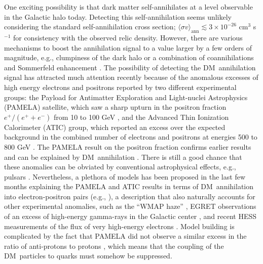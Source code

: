 \documentclass[aps,prd,twocolumn,amsmath,amssymb,floatfix,nofootinbib,10pt]{revtex4}
\newcommand{\DM}{DM}
\newcommand{\sigmaannv}{\ensuremath{\langle\sigma v\rangle}}
\begin{document}
One exciting possibility is that dark matter self-annihilates at a
level observable in the Galactic halo today. Detecting this
self-annihilation seems unlikely considering the standard
self-annihilation cross section; $\sigmaannv_{\mathrm{ann}} \lesssim 3
\times 10^{-26} $ cm$^3$ s$^{-1}$ for consistency with the observed
relic density. However, there are various mechanisms to boost the
annihilation signal to a value larger by a few orders of magnitude,
e.g., clumpiness of the dark halo
\cite{1993ApJ...411..439S,1999PhRvD..59d3506B,2008A&A...479..427L,2008ApJ...686..262K}
or a combination of coannihilations and Sommerfeld enhancement
\cite{2005PhRvD..72j3521P,2008arXiv0812.0360L}. The possibility of
detecting the \DM\ annihilation signal has attracted much attention
recently because of the anomalous excesses of high energy electrons
and positrons reported by two different experimental groups: the
Payload for Antimatter Exploration and Light-nuclei Astrophysics
(PAMELA) satellite, which saw a sharp upturn in the positron fraction
$e^+/(e^++e^-)$ from 10 to 100 GeV \cite{Adriani:2008zr}, and the
Advanced Thin Ionization Calorimeter (ATIC) group, which reported an
excess over the expected background in the combined number of
electrons and positrons at energies 500 to 800 GeV
\cite{2008Natur.456..362C}. The PAMELA result on the positron fraction
confirms earlier results
\cite{1969ApJ...158..771F,1975ApJ...199..669B,1987ApJ...312..183M,1994ApJ...436..769G,Barwick:1997ig,Beatty:2004cy,Aguilar:2007yf}
and can be explained by \DM\ annihilation
\cite{2002PhLB..536..263K,2004PhRvD..69j3509H,2008arXiv0810.5344C}. There
is still a good chance that these anomalies can be obviated by
conventional astrophysical effects, e.g., pulsars
\cite{1995A&A...294L..41A,2008arXiv0810.1527H,2008arXiv0810.2784Y,2008arXiv0812.4457P}. Nevertheless,
a plethora of models has been proposed in the last few months
explaining the PAMELA and ATIC results in terms of \DM\ annihilation
into electron-positron pairs (e.g.,
\cite{2008arXiv0810.5557H,ArkaniHamed:2008qn,2008arXiv0811.0399F,2008arXiv0811.1555I,2008arXiv0811.3357C,2008arXiv0811.3641C,2008arXiv0812.2196A}),
a description that also naturally accounts for other experimental
anomalies, such as the ``WMAP haze''
\cite{Finkbeiner:2003im,Dobler:2007wv,Hooper:2007kb}, EGRET
observations of an excess of high-energy gamma-rays in the Galactic
center \cite{Strong:2005zx}, and recent HESS measurements of the flux
of very high-energy electrons \cite{2008arXiv0811.3894H}. Model
building is complicated by the fact that PAMELA did not observe a
similar excess in the ratio of anti-protons to protons
\cite{2008arXiv0810.4994A}, which means that the coupling of the \DM\
particles to quarks must somehow be suppressed.
\end{document}
